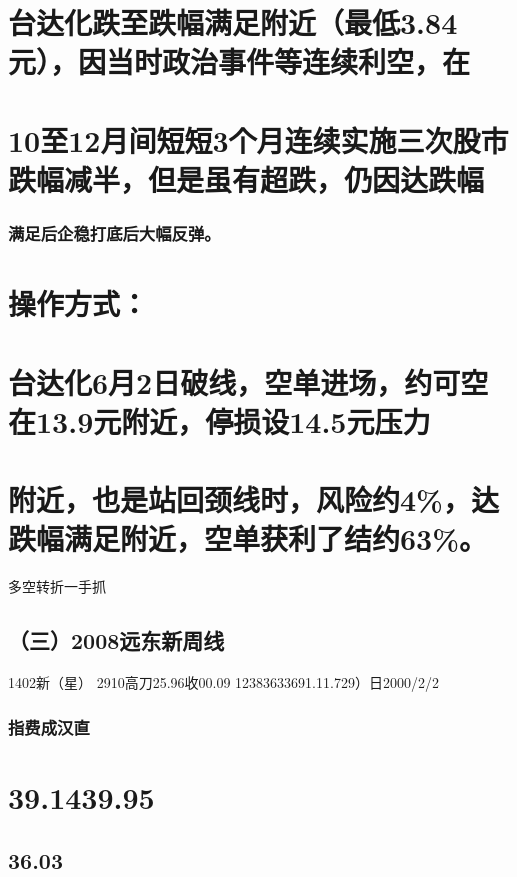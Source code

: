 \documentclass{article}
\begin{document}
\section{台达化跌至跌幅满足附近（最低3.84元），因当时政治事件等连续利空，在}

\section{10至12月间短短3个月连续实施三次股市跌幅减半，但是虽有超跌，仍因达跌幅}

\subsubsection{满足后企稳打底后大幅反弹。}

\section{操作方式：}

\section{台达化6月2日破线，空单进场，约可空在13.9元附近，停损设14.5元压力}

\section{附近，也是站回颈线时，风险约4\%，达跌幅满足附近，空单获利了结约63\%。}

\clearpage

多空转折一手抓

\subsection{（三）2008远东新周线}

1402新（星） 2910高刀25.96收00.09 12383633691.11.729）日2000/2/2

\subsubsection{指费成汉直}

\section{39.1439.95}

\subsection{36.03}
\end{document}
